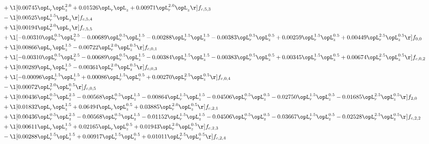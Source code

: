 \begin{alignat}{2}
& + \l[  0.00745 \opL_r \opL_z^{2.0} +  0.01526 \opL_r \opL_z +  0.00971 \opL_r^{2.0} \opL_z  \r] f_{c,5,3} \nonumber \\ 
& - \l[  0.00525 \opL_r^{1.5} \opL_z  \r] f_{c,5,4} \nonumber \\ 
& + \l[  0.00194 \opL_r^{2.0} \opL_z  \r] f_{c,5,5} \nonumber \\ 
& + \l[  -0.00310 \opL_r^{0.5} \opL_z^{2.5}   -0.00689 \opL_r^{0.5} \opL_z^{1.5}   -0.00288 \opL_r^{1.5} \opL_z^{1.5}   -0.00383 \opL_r^{0.5} \opL_z^{0.5} +  0.00259 \opL_r^{1.5} \opL_z^{0.5} +  0.00449 \opL_r^{2.5} \opL_z^{0.5}  \r] f_{0,0} \nonumber \\ 
& + \l[  0.00866 \opL_r \opL_z^{1.5}   -0.00722 \opL_r^{2.0} \opL_z^{0.5}  \r] f_{c,0,1} \nonumber \\ 
& + \l[  -0.00310 \opL_r^{0.5} \opL_z^{2.5}   -0.00689 \opL_r^{0.5} \opL_z^{1.5}   -0.00384 \opL_r^{1.5} \opL_z^{1.5}   -0.00383 \opL_r^{0.5} \opL_z^{0.5} +  0.00345 \opL_r^{1.5} \opL_z^{0.5} +  0.00674 \opL_r^{2.5} \opL_z^{0.5}  \r] f_{c,0,2} \nonumber \\ 
& + \l[  0.00289 \opL_r \opL_z^{1.5}   -0.00361 \opL_r^{2.0} \opL_z^{0.5}  \r] f_{c,0,3} \nonumber \\ 
& + \l[  -0.00096 \opL_r^{1.5} \opL_z^{1.5} +  0.00086 \opL_r^{1.5} \opL_z^{0.5} +  0.00270 \opL_r^{2.5} \opL_z^{0.5}  \r] f_{c,0,4} \nonumber \\ 
& - \l[  0.00072 \opL_r^{2.0} \opL_z^{0.5}  \r] f_{c,0,5} \nonumber \\ 
& + \l[  0.00436 \opL_r^{0.5} \opL_z^{2.5}   -0.00568 \opL_r^{0.5} \opL_z^{1.5}   -0.00864 \opL_r^{1.5} \opL_z^{1.5}   -0.04506 \opL_r^{0.5} \opL_z^{0.5}   -0.02750 \opL_r^{1.5} \opL_z^{0.5}   -0.01685 \opL_r^{2.5} \opL_z^{0.5}  \r] f_{2,0} \nonumber \\ 
& + \l[  0.01832 \opL_r \opL_z^{1.5} +  0.06494 \opL_r \opL_z^{0.5} +  0.03885 \opL_r^{2.0} \opL_z^{0.5}  \r] f_{c,2,1} \nonumber \\ 
& + \l[  0.00436 \opL_r^{0.5} \opL_z^{2.5}   -0.00568 \opL_r^{0.5} \opL_z^{1.5}   -0.01152 \opL_r^{1.5} \opL_z^{1.5}   -0.04506 \opL_r^{0.5} \opL_z^{0.5}   -0.03667 \opL_r^{1.5} \opL_z^{0.5}   -0.02528 \opL_r^{2.5} \opL_z^{0.5}  \r] f_{c,2,2} \nonumber \\ 
& + \l[  0.00611 \opL_r \opL_z^{1.5} +  0.02165 \opL_r \opL_z^{0.5} +  0.01943 \opL_r^{2.0} \opL_z^{0.5}  \r] f_{c,2,3} \nonumber \\ 
& - \l[  0.00288 \opL_r^{1.5} \opL_z^{1.5} +  0.00917 \opL_r^{1.5} \opL_z^{0.5} +  0.01011 \opL_r^{2.5} \opL_z^{0.5}  \r] f_{c,2,4} \nonumber \\ 

\end{alignat}
